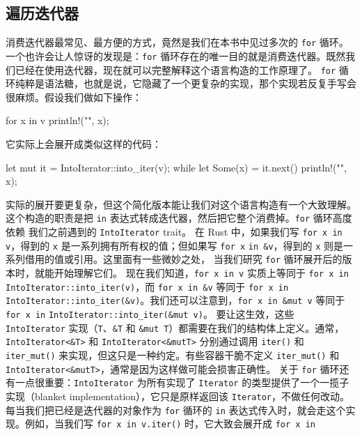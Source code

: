 \subsection{遍历迭代器}
\label{idx:idx_535d380f}
消费迭代器最常见、最方便的方式，竟然是我们在本书中见过多次的 \texttt{for} 循环。一个也许会让人惊讶的发现是：\texttt{for} 循环存在的唯一目的就是消费迭代器。既然我们已经在使用迭代器，现在就可以完整解释这个语言构造的工作原理了。
\texttt{for} 循环纯粹是语法糖，也就是说，它隐藏了一个更复杂的实现，那个实现若反复手写会很麻烦。假设我们做如下操作：
\begin{codebox}[text]
for x in v {
    println!("{}", x);
}
\end{codebox}
它实际上会展开成类似这样的代码：
\begin{codebox}[rust]
let mut it = IntoIterator::into_iter(v);
while let Some(x) = it.next() {
    println!("{}", x);
}
\end{codebox}
实际的展开要更复杂，但这个简化版本能让我们对这个语言构造有一个大致理解。这个构造的职责是把 \texttt{in} 表达式转成迭代器，然后把它整个消费掉。\texttt{for} 循环高度依赖
我们之前遇到的 \texttt{IntoIterator} trait。
在 Rust 中，如果我们写 \texttt{for x in v}，得到的 \texttt{x} 是一系列拥有所有权的值；但如果写 \texttt{for x}
\texttt{in \&v}，得到的 \texttt{x} 则是一系列借用的值或引用。这里面有一些微妙之处，
当我们研究 \texttt{for} 循环展开后的版本时，就能开始理解它们。
现在我们知道，\texttt{for x in v} 实质上等同于 \texttt{for x in}
\texttt{IntoIterator::\allowbreak{}into\_\allowbreak{}iter(\allowbreak{}v)\allowbreak{}}，而 \texttt{for x in \&\allowbreak{}v} 等同于 \texttt{for x in IntoIterator::\allowbreak{}into\_\allowbreak{}iter(\allowbreak{}\&\allowbreak{}v)\allowbreak{}}。我们还可以注意到，\texttt{for x in \&\allowbreak{}mut v} 等同于 \texttt{for x in}
\texttt{IntoIterator::\allowbreak{}into\_\allowbreak{}iter(\allowbreak{}\&\allowbreak{}mut v)\allowbreak{}}。
\label{idx:idx_3100564f}
要让这生效，这些 \texttt{IntoIterator} 实现（\texttt{T}、\texttt{\&T} 和 \texttt{\&mut T}）都需要在我们的结构体上定义。通常，\texttt{IntoIterator<\allowbreak{}\&\allowbreak{}T>\allowbreak{}} 和 \texttt{IntoIterator<\allowbreak{}\&\allowbreak{}mutT>\allowbreak{}} 分别通过调用 \texttt{iter()} 和 \texttt{iter\_mut()} 来实现，但这只是一种约定。有些容器干脆不定义 \texttt{iter\_mut()} 和 \texttt{IntoIterator<\allowbreak{}\&\allowbreak{}mutT>\allowbreak{}}，通常是因为这样做可能会损害正确性。
关于 \texttt{for} 循环还有一点很重要：\texttt{IntoIterator} 为所有实现了 \texttt{Iterator} 的类型提供了一个一揽子实现（blanket implementation），它只是原样返回该 \texttt{Iterator}，不做任何改动。每当我们把已经是迭代器的对象作为 \texttt{for} 循环的 \texttt{in} 表达式传入时，就会走这个实现。例如，当我们写 \texttt{for x in v.\allowbreak{}iter(\allowbreak{})\allowbreak{}} 时，它大致会展开成 \texttt{for x in}
